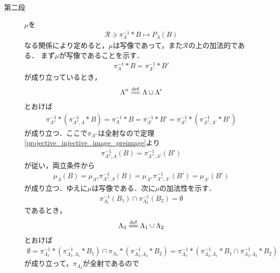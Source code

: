 \begin{prf}
\begin{description}
			\item[第二段]
				$\mu$を
				\begin{align}
					\mathscr{R} \ni \pi_\Lambda^{-1} \ast B \longmapsto P_\Lambda(B)
				\end{align}
				なる関係により定めると，$\mu$は写像であって，また$\mathscr{R}$の上の加法的である．
				まず$\mu$が写像であることを示す．
				\begin{align}
					\pi_\Lambda^{-1} \ast B = \pi_{\Lambda'}^{-1} \ast B'
				\end{align}
				が成り立っているとき，
				\begin{align}
					\Lambda'' \defeq \Lambda \cup \Lambda'
				\end{align}
				とおけば
				\begin{align}
					\pi_{\Lambda''}^{-1} \ast \left( \pi_{\Lambda'',\Lambda}^{-1} \ast B \right)
					= \pi_\Lambda^{-1} \ast B
					= \pi_{\Lambda'}^{-1} \ast B'
					= \pi_{\Lambda''}^{-1} \ast \left( \pi_{\Lambda'',\Lambda'}^{-1} \ast B' \right)
				\end{align}
				が成り立つ．ここで$\pi_{\Lambda''}$は全射なので定理\ref{projective_injective_image_preimage}より
				\begin{align}
					\pi_{\Lambda'',\Lambda}^{-1}(B) = \pi_{\Lambda'',\Lambda'}^{-1}(B')
				\end{align}
				が従い，両立条件から
				\begin{align}
					\mu_\Lambda(B) 
					= \mu_{\Lambda''} \pi_{\Lambda'',\Lambda}^{-1}(B)
					= \mu_{\Lambda''} \pi_{\Lambda'',\Lambda'}^{-1}(B')
					= \mu_{\Lambda'}(B')
				\end{align}
				が成り立つ．ゆえに$\mu$は写像である．次に$\mu$の加法性を示す．
				\begin{align}
					\pi_{\Lambda_1}^{-1}(B_1) \cap \pi_{\Lambda_2}^{-1}(B_2) = \emptyset
				\end{align}
				であるとき，
				\begin{align}
					\Lambda_3 \defeq \Lambda_1 \cup \Lambda_2
				\end{align}
				とおけば
				\begin{align}
					\emptyset 
					= \pi_{\Lambda_3}^{-1} \ast \left( \pi_{\Lambda_3,\Lambda_1}^{-1} \ast B_1 \right)
					\cap \pi_{\Lambda_3} \ast \left( \pi_{\Lambda_3,\Lambda_2}^{-1} \ast B_2 \right)
					= \pi_{\Lambda_3}^{-1} \ast \left( \pi_{\Lambda_3,\Lambda_1}^{-1} \ast B_1 \cap \pi_{\Lambda_3,\Lambda_2}^{-1} \ast B_2 \right)
				\end{align}
				が成り立って，$\pi_{\Lambda_3}$が全射であるので

\end{description}
\end{prf}
